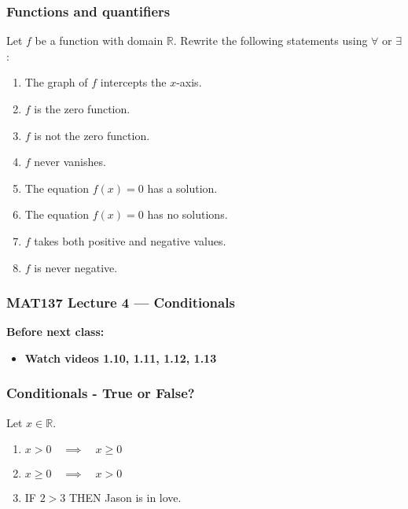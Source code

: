 \documentclass[14pt]{beamer}
\newcommand {\DS} [1] {${\displaystyle #1}$}
\newcommand {\R}{\mathbb{R}}
\newcommand{\p}{\pause}
\begin{document}
\begin{frame}
\frametitle{Functions and quantifiers}

Let $f$ be a function with domain $\R$.  Rewrite the following statements using $\forall$ or $\exists$:

\begin{enumerate}
	\item  The graph of $f$ intercepts the $x$-axis.
	\item  $f$ is the zero function.
	\item  $f$ is not the zero function.
	\item  $f$ never vanishes.
	\item  The equation \DS{f(x)=0} has a solution.
	\item  The equation \DS{f(x)=0} has no solutions.
	\item $f$ takes both positive and negative values.
	\item $f$ is never negative.
\end{enumerate}


\end{frame}


\begin{frame}
\frametitle{MAT137 Lecture 4 --- Conditionals}

	\vfill
	{\bf Before next class:}
		\begin{itemize} \normalsize
			\item {\bf Watch videos 1.10, 1.11, 1.12, 1.13 }
		\end{itemize}
	\vfill

\end{frame}


\begin{frame}
\frametitle{ Conditionals - True or False?}


Let \DS{x \in \R}.  

	\begin{enumerate}
		\item \DS{x > 0 \quad \implies \quad x \geq 0}
		\item \DS{x \geq 0 \quad \implies \quad x > 0}
		
		\vfill \p
		
		\item IF \DS{2 > 3}  THEN Jason is in love.
	\end{enumerate}

\vfill

\end{frame}
\end{document}
